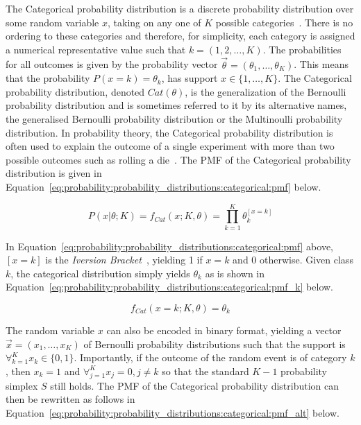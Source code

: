 The Categorical probability distribution is a discrete probability distribution over some random variable $x$, taking on any one of $K$ possible categories~\cite{ref:wackerly:2014}. There is no ordering to these categories and therefore, for simplicity, each category is assigned a numerical representative value such that $k = (1, 2, \dots, K)$. The probabilities for all outcomes is given by the probability vector $\vec{\theta} = (\theta_{1}, \dots, \theta_{K})$.  This means that the probability $P(x=k)=\theta_{k}$, has support $x \in \{1, \dots, K\}$. The Categorical probability distribution, denoted $Cat(\theta)$, is the generalization of the Bernoulli probability distribution and is sometimes referred to it by its alternative names, the generalised Bernoulli probability distribution or the Multinoulli probability distribution. In probability theory, the Categorical probability distribution is often used to explain the outcome of a single experiment with more than two possible outcomes such as rolling a die~\cite{ref:wackerly:2014}. The \acs{PMF} of the Categorical probability distribution is given in Equation~\eqref{eq:probability:probability_distributions:categorical:pmf} below.

\begin{equation}
      \label{eq:probability:probability_distributions:categorical:pmf}
      P(x \vert \theta; K) = f_{Cat}(x; K, \theta) = \prod_{k=1}^{K}\theta_{k}^{[x = k]}
\end{equation}

\noindent
In Equation~\eqref{eq:probability:probability_distributions:categorical:pmf} above, $[x = k]$ is the \textit{Iversion Bracket}~\cite{ref:iverson:1962}, yielding 1 if $x = k$ and 0 otherwise. Given class $k$, the categorical distribution simply yields $\theta_{k}$ as is shown in Equation~\eqref{eq:probability:probability_distributions:categorical:pmf_k} below.

\begin{equation}
      \label{eq:probability:probability_distributions:categorical:pmf_k}
      f_{Cat}(x=k; K, \theta) = \theta_{k}
\end{equation}

\noindent
The random variable $x$ can also be encoded in binary format, yielding a vector $\vec{x} = (x_{1}, \dots, x_{K})$ of Bernoulli probability distributions such that the support is $\forall_{k=1}^{K} x_{k} \in \{0, 1\}$. Importantly, if the outcome of the random event is of category $k$, then $x_{k} = 1$ and $\forall_{j=1}^{K} x_{j} = 0, j \neq k$ so that the standard $K-1$ probability simplex $S$ still holds. The \acs{PMF} of the Categorical probability distribution can then be rewritten as follows in Equation~\eqref{eq:probability:probability_distributions:categorical:pmf_alt} below.


